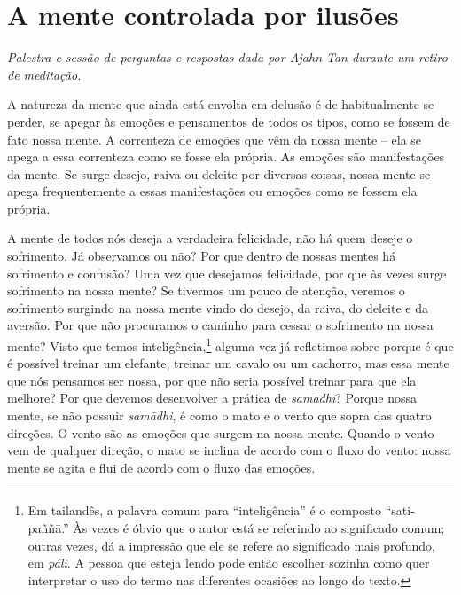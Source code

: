 
\chapter{A mente controlada por ilusões}

{\itshape
Palestra e sessão de perguntas e respostas dada por Ajahn Tan durante um
retiro de meditação.}

A natureza da mente que ainda está envolta em delusão é de
habitualmente se perder, se apegar às emoções e pensamentos de todos os
tipos, como se fossem de fato nossa mente. A correnteza de emoções que
vêm da nossa mente – ela se apega a essa correnteza como se fosse ela
própria. As emoções são manifestações da mente. Se surge desejo, raiva
ou deleite por diversas coisas, nossa mente se apega frequentemente a
essas manifestações ou emoções como se fossem ela própria.

A mente de todos nós deseja a verdadeira felicidade, não há quem
deseje o sofrimento. Já observamos ou não? Por que dentro de nossas
mentes há sofrimento e confusão? Uma vez que desejamos felicidade, por
que às vezes surge sofrimento na nossa mente? Se tivermos um pouco de
atenção, veremos o sofrimento surgindo na nossa mente vindo do desejo,
da raiva, do deleite e da aversão. Por que não procuramos o caminho
para cessar o sofrimento na nossa mente? Visto que temos
inteligência,\footnote{Em tailandês, a palavra comum para “inteligência”
é o composto “sati-paññā.” Às vezes é óbvio que o autor está se
referindo ao significado comum; outras vezes, dá a impressão que ele se
refere ao significado mais profundo, em \textit{páli}. A pessoa que
esteja lendo pode então escolher sozinha como quer interpretar o uso do
termo nas diferentes ocasiões ao longo do texto.} alguma vez já
refletimos sobre porque é que é possível treinar um elefante, treinar
um cavalo ou um cachorro, mas essa mente que nós pensamos ser nossa,
por que não seria possível treinar para que ela melhore? Por que
devemos desenvolver a prática de \textit{samādhi}? Porque nossa
mente, se não possuir \textit{samādhi}, é como o mato e o vento que
sopra das quatro direções. O vento são as emoções que surgem na nossa
mente. Quando o vento vem de qualquer direção, o mato se inclina de
acordo com o fluxo do vento: nossa mente se agita e flui de acordo com
o fluxo das emoções.

